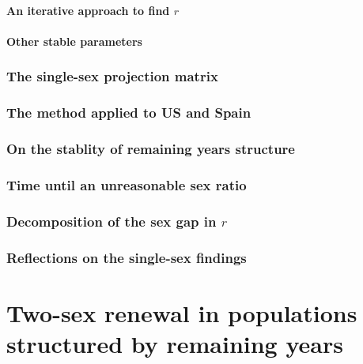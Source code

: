       \subsection{An iterative approach to find $r$}
        
        
      \subsection{Other stable parameters}
        
      
    \section{The single-sex projection matrix}
      
    \section{The method applied to US and Spain}
      
    \section{On the stablity of remaining years structure}
      
    \section{Time until an unreasonable sex ratio}
      
    \section{Decomposition of the sex gap in $r$}
      
      
    \section{Reflections on the single-sex findings}
      
\part*{Two-sex renewal in populations structured by remaining years}
  
  
